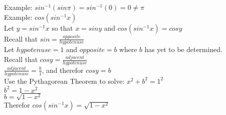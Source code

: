 \documentclass{article}
\begin{document}
\noindent
Example: $sin^{-1}(sin\pi) = sin^{-1}(0) = 0 \neq \pi$\\

\noindent
Example: $cos(sin^{-1}x)$\\
Let $y = sin^{-1}x$ so that $x = siny$ and $cos(sin^{-1}x) = cosy$\\
Recall that $sin = \frac{opposite}{hypotenuse}$\\
Let $hypotenuse = 1$ and $opposite = b$ where $b$ has yet to be determined.\\
Recall that $cosy = \frac{adjacent}{hypotenuse}$\\
$\frac{adjacent}{hypotenuse} = \frac{b}{1}$, and therefor $cosy = b$\\
Use the Pythagorean Theorem to solve: $x^2 + b^2 = 1^2$\\
$b^2 = 1 - x^2$\\
$b = \sqrt{1 - x^2}$\\
Therefor $cos(sin^{-1}x) = \sqrt{1 - x^2}$
\end{document}
